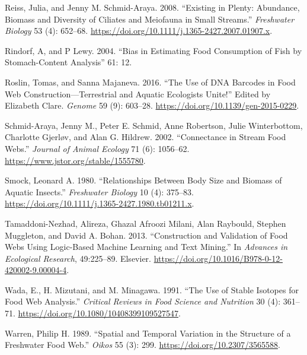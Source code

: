 \documentclass{article}
\newlength{\cslhangindent}
\newlength{\cslentryspacingunit} %
\newenvironment{CSLReferences}[2] %
 {%
  \setlength{\parindent}{0pt}
  \ifodd #1
  \let\oldpar\par
  \def\par{\hangindent=\cslhangindent\oldpar}
  \fi
  \setlength{\parskip}{#2\cslentryspacingunit}
 }%
 {}
\begin{document}
\begin{CSLReferences}{1}{0}
\leavevmode{}%
Reiss, Julia, and Jenny M. Schmid-Araya. 2008. {``Existing in Plenty:
Abundance, Biomass and Diversity of Ciliates and Meiofauna in Small
Streams.''} \emph{Freshwater Biology} 53 (4): 652--68.
\url{https://doi.org/10.1111/j.1365-2427.2007.01907.x}.

\leavevmode{}%
Rindorf, A, and P Lewy. 2004. {``Bias in Estimating Food Consumption of
Fish by Stomach-Content Analysis''} 61: 12.

\leavevmode{}%
Roslin, Tomas, and Sanna Majaneva. 2016. {``The Use of {DNA} Barcodes in
Food Web Construction---Terrestrial and Aquatic Ecologists Unite!''}
Edited by Elizabeth Clare. \emph{Genome} 59 (9): 603--28.
\url{https://doi.org/10.1139/gen-2015-0229}.

\leavevmode{}%
Schmid-Araya, Jenny M., Peter E. Schmid, Anne Robertson, Julie
Winterbottom, Charlotte Gjerløv, and Alan G. Hildrew. 2002.
{``Connectance in {Stream Food Webs}.''} \emph{Journal of Animal
Ecology} 71 (6): 1056--62. \url{https://www.jstor.org/stable/1555780}.

\leavevmode{}%
Smock, Leonard A. 1980. {``Relationships Between Body Size and Biomass
of Aquatic Insects.''} \emph{Freshwater Biology} 10 (4): 375--83.
\url{https://doi.org/10.1111/j.1365-2427.1980.tb01211.x}.

\leavevmode{}%
Tamaddoni-Nezhad, Alireza, Ghazal Afroozi Milani, Alan Raybould, Stephen
Muggleton, and David A. Bohan. 2013. {``Construction and {Validation} of
{Food Webs Using Logic}-{Based Machine Learning} and {Text Mining}.''}
In \emph{Advances in {Ecological Research}}, 49:225--89. {Elsevier}.
\url{https://doi.org/10.1016/B978-0-12-420002-9.00004-4}.

\leavevmode{}%
Wada, E., H. Mizutani, and M. Minagawa. 1991. {``The Use of Stable
Isotopes for Food Web Analysis.''} \emph{Critical Reviews in Food
Science and Nutrition} 30 (4): 361--71.
\url{https://doi.org/10.1080/10408399109527547}.

\leavevmode{}%
Warren, Philip H. 1989. {``Spatial and {Temporal Variation} in the
{Structure} of a {Freshwater Food Web}.''} \emph{Oikos} 55 (3): 299.
\url{https://doi.org/10.2307/3565588}.


\end{CSLReferences}
\end{document}
